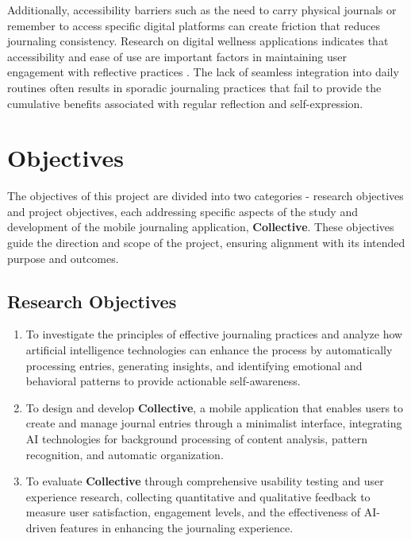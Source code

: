 Additionally, accessibility barriers such as the need to carry physical journals or remember to access specific digital platforms can create friction that reduces journaling consistency. Research on digital wellness applications indicates that accessibility and ease of use are important factors in maintaining user engagement with reflective practices \cite{sloan2015efficacy}. The lack of seamless integration into daily routines often results in sporadic journaling practices that fail to provide the cumulative benefits associated with regular reflection and self-expression.

\section{Objectives}\label{sec:objectives}

The objectives of this project are divided into two categories - research objectives and project objectives, each addressing specific aspects of the study and development of the mobile journaling application, \textbf{Collective}. These objectives guide the direction and scope of the project, ensuring alignment with its intended purpose and outcomes.

\subsection{Research Objectives}\label{subsec:research-objectives}

\begin{enumerate}
	\item To investigate the principles of effective journaling practices and analyze how artificial intelligence technologies can enhance the process by automatically processing entries, generating insights, and identifying emotional and behavioral patterns to provide actionable self-awareness.
	
	\item To design and develop \textbf{Collective}, a mobile application that enables users to create and manage journal entries through a minimalist interface, integrating AI technologies for background processing of content analysis, pattern recognition, and automatic organization.
	
	\item To evaluate \textbf{Collective} through comprehensive usability testing and user experience research, collecting quantitative and qualitative feedback to measure user satisfaction, engagement levels, and the effectiveness of AI-driven features in enhancing the journaling experience.
\end{enumerate}

